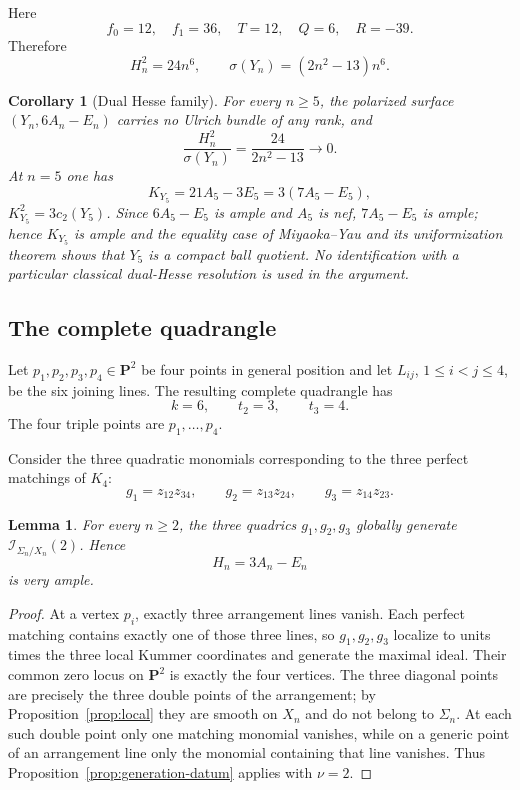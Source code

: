 \documentclass[11pt]{article}
\newtheorem{lemma}[theorem]{Lemma}
\newtheorem{corollary}[theorem]{Corollary}
\newcommand{\PP}{\mathbf P}
\newcommand{\cI}{\mathcal I}
\newcommand{\sig}{\sigma}
\begin{document}
Here
\[
 f_0=12,\quad f_1=36,\quad T=12,
 \quad Q=6,\quad R=-39.
\]
Therefore
\begin{equation}\label{eq:dual-family}
 H_n^2=24n^6,
 \qquad
 \sig(Y_n)=(2n^2-13)n^6.
\end{equation}

\begin{corollary}[Dual Hesse family]\label{cor:dual-family}
For every $n\ge5$, the polarized surface $(Y_n,6A_n-E_n)$ carries no Ulrich
bundle of any rank, and
\[
        \frac{H_n^2}{\sig(Y_n)}=\frac{24}{2n^2-13}\longrightarrow0.
\]
At $n=5$ one has
\[
 K_{Y_5}=21A_5-3E_5=3(7A_5-E_5),
\]
$K_{Y_5}^2=3c_2(Y_5)$.  Since $6A_5-E_5$ is ample and $A_5$ is nef,
$7A_5-E_5$ is ample; hence $K_{Y_5}$ is ample and the equality case of
Miyaoka--Yau and its uniformization theorem
\cite{Miyaoka1977,Yau1977,GrebKebekusPeternellTaji} shows that $Y_5$ is a compact ball
quotient.  No identification with a particular classical dual-Hesse resolution
is used in the argument.
\end{corollary}

\subsection{The complete quadrangle}

Let $p_1,p_2,p_3,p_4\in\PP^2$ be four points in general position and let
$L_{ij}$, $1\le i<j\le4$, be the six joining lines.  The resulting complete
quadrangle has
\[
        k=6,\qquad t_2=3,\qquad t_3=4.
\]
The four triple points are $p_1,\ldots,p_4$.

Consider the three quadratic monomials corresponding to the three perfect
matchings of $K_4$:
\[
 g_1=z_{12}z_{34},\qquad
 g_2=z_{13}z_{24},\qquad
 g_3=z_{14}z_{23}.
\]

\begin{lemma}\label{lem:quadrangle-generation}
For every $n\ge2$, the three quadrics $g_1,g_2,g_3$ globally generate
$\cI_{\Sigma_n/X_n}(2)$.  Hence
\[
        H_n=3A_n-E_n
\]
is very ample.
\end{lemma}

\begin{proof}
At a vertex $p_i$, exactly three arrangement lines vanish.  Each perfect matching
contains exactly one of those three lines, so $g_1,g_2,g_3$ localize to units
times the three local Kummer coordinates and generate the maximal ideal.
Their common zero locus on $\PP^2$ is exactly the four vertices.  The three
diagonal points are precisely the three double points of the arrangement; by
Proposition~\ref{prop:local} they are smooth on $X_n$ and do not belong to
$\Sigma_n$.  At each such double point only one matching monomial vanishes, while
on a generic point of an arrangement line only the monomial containing that line
vanishes.  Thus
Proposition~\ref{prop:generation-datum} applies with $\nu=2$.
\end{proof}
\end{document}
